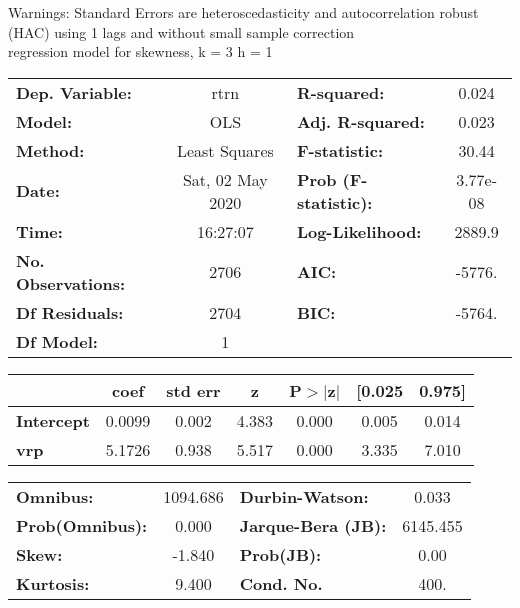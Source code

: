 Warnings: \newline
 [1] Standard Errors are heteroscedasticity and autocorrelation robust (HAC) using 1 lags and without small sample correction\\ 

regression model for skewness, k = 3 h = 1\begin{center}
\begin{tabular}{lclc}
\toprule
\textbf{Dep. Variable:}    &       rtrn       & \textbf{  R-squared:         } &     0.024   \\
\textbf{Model:}            &       OLS        & \textbf{  Adj. R-squared:    } &     0.023   \\
\textbf{Method:}           &  Least Squares   & \textbf{  F-statistic:       } &     30.44   \\
\textbf{Date:}             & Sat, 02 May 2020 & \textbf{  Prob (F-statistic):} &  3.77e-08   \\
\textbf{Time:}             &     16:27:07     & \textbf{  Log-Likelihood:    } &    2889.9   \\
\textbf{No. Observations:} &        2706      & \textbf{  AIC:               } &    -5776.   \\
\textbf{Df Residuals:}     &        2704      & \textbf{  BIC:               } &    -5764.   \\
\textbf{Df Model:}         &           1      & \textbf{                     } &             \\
\bottomrule
\end{tabular}
\begin{tabular}{lcccccc}
                   & \textbf{coef} & \textbf{std err} & \textbf{z} & \textbf{P$> |$z$|$} & \textbf{[0.025} & \textbf{0.975]}  \\
\midrule
\textbf{Intercept} &       0.0099  &        0.002     &     4.383  &         0.000        &        0.005    &        0.014     \\
\textbf{vrp}       &       5.1726  &        0.938     &     5.517  &         0.000        &        3.335    &        7.010     \\
\bottomrule
\end{tabular}
\begin{tabular}{lclc}
\textbf{Omnibus:}       & 1094.686 & \textbf{  Durbin-Watson:     } &    0.033  \\
\textbf{Prob(Omnibus):} &   0.000  & \textbf{  Jarque-Bera (JB):  } & 6145.455  \\
\textbf{Skew:}          &  -1.840  & \textbf{  Prob(JB):          } &     0.00  \\
\textbf{Kurtosis:}      &   9.400  & \textbf{  Cond. No.          } &     400.  \\
\bottomrule
\end{tabular}
\end{center}

